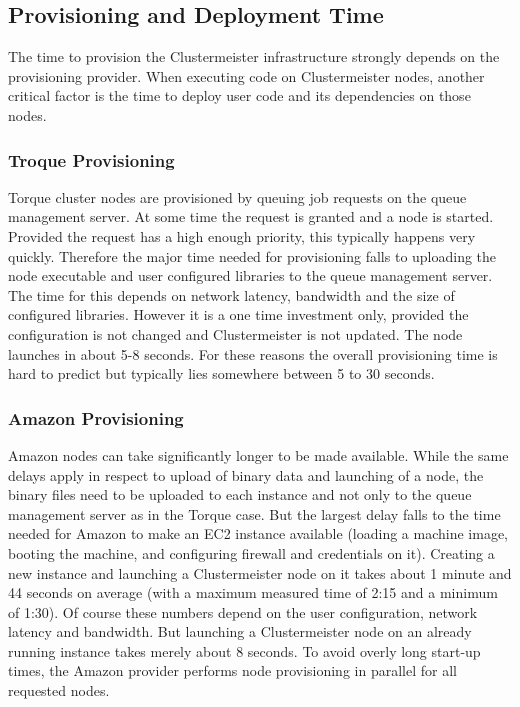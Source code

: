 \documentclass[english]{uzhpub}
\begin{document}
\subsection{Provisioning and Deployment Time}

The time to provision the Clustermeister infrastructure strongly depends on the provisioning provider. When executing code on Clustermeister nodes, another critical factor is the time to deploy user code and its dependencies on those nodes. 

\subsubsection{Troque Provisioning}
Torque cluster nodes are provisioned by queuing job requests on the queue management server. At some time the request is granted and a node is started. Provided the request has a high enough priority, this typically happens very quickly. Therefore the major time needed for provisioning falls to uploading the node executable and user configured libraries to the queue management server. The time for this depends on network latency, bandwidth and the size of configured libraries. However it is a one time investment only, provided the configuration is not changed and Clustermeister is not updated. The node launches in about 5-8 seconds. For these reasons the overall provisioning time is hard to predict but typically lies somewhere between 5 to 30 seconds.

\subsubsection{Amazon Provisioning}
\label{azn-prov}
Amazon nodes can take significantly longer to be made available. While the same delays apply in respect to upload of binary data and launching of a node, the binary files need to be uploaded to each instance and not only to the queue management server as in the Torque case. But the largest delay falls to the time needed for Amazon to make an EC2 instance available (loading a machine image, booting the machine, and configuring firewall and credentials on it). Creating a new instance and launching a Clustermeister node on it takes about 1 minute and 44 seconds on average (with a maximum measured time of 2:15 and a minimum of 1:30). Of course these numbers depend on the user configuration, network latency and bandwidth. But launching a Clustermeister node on an already running instance takes merely about 8 seconds. To avoid overly long start-up times, the Amazon provider performs node provisioning in parallel for all requested nodes.
\end{document}
